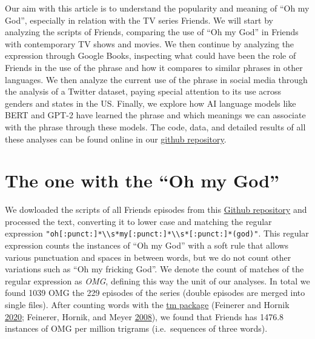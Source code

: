 \documentclass[]{article}
\begin{document}
Our aim with this article is to understand the popularity and meaning of ``Oh my God'', especially in relation with the TV series Friends. We will start by analyzing the scripts of Friends, comparing the use of ``Oh my God'' in Friends with contemporary TV shows and movies. We then continue by analyzing the expression through Google Books, inspecting what could have been the role of Friends in the use of the phrase and how it compares to similar phrases in other languages. We then analyze the current use of the phrase in social media through the analysis of a Twitter dataset, paying special attention to its use across genders and states in the US. Finally, we explore how AI language models like BERT and GPT-2 have learned the phrase and which meanings we can associate with the phrase through these models. The code, data, and detailed results of all these analyses can be found online in our \href{https://github.com/dgarcia-eu/Friends_HPS2020}{github repository}.

\newpage

\hypertarget{the-one-with-the-oh-my-god}{%
\section{The one with the ``Oh my God''}\label{the-one-with-the-oh-my-god}}

We dowloaded the scripts of all Friends episodes from this \href{https://github.com/fangj/friends}{Github repository} and processed the text, converting it to lower case and matching the regular expression \texttt{"oh{[}:punct:{]}*\textbackslash{}\textbackslash{}s*my{[}:punct:{]}*\textbackslash{}\textbackslash{}s*{[}:punct:{]}*(god)"}. This regular expression counts the instances of ``Oh my God'' with a soft rule that allows various punctuation and spaces in between words, but we do not count other variations such as ``Oh my fricking God''. We denote the count of matches of the regular expression as \emph{OMG}, defining this way the unit of our analyses. In total we found 1039 OMG the 229 episodes of the series (double episodes are merged into single files). After counting words with the \href{https://cran.r-project.org/web/packages/tm/index.html}{tm package} (Feinerer and Hornik \protect\hyperlink{ref-tm1}{2020}; Feinerer, Hornik, and Meyer \protect\hyperlink{ref-tm2}{2008}), we found that Friends has 1476.8 instances of OMG per million trigrams (i.e.~sequences of three words).
\end{document}
